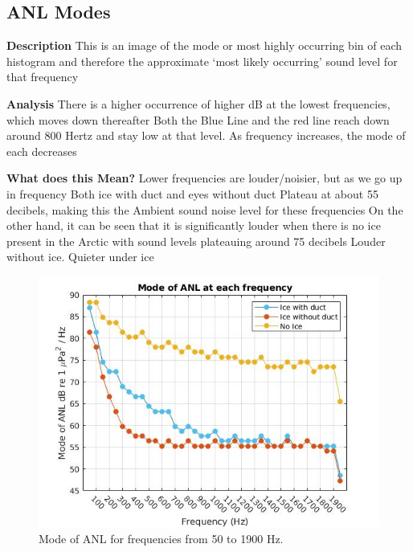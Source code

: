 \subsection{ANL Modes}
\textbf{Description}
This is an image of the mode or most highly occurring bin of each histogram and therefore the approximate ‘most likely occurring’ sound level for that frequency

\textbf{Analysis}
There is a higher occurrence of higher dB at the lowest frequencies, which moves down thereafter
 Both the Blue Line and the red line reach down around 800 Hertz and stay low at that level.
As frequency increases, the mode of each decreases

\textbf{What does this Mean?}
Lower frequencies are louder/noisier, but as we go up in frequency Both ice with duct and eyes without duct Plateau at about 55 decibels, making this the Ambient sound noise level for these frequencies
On the other hand, it can be seen that it is significantly louder when there is no ice present in the Arctic with sound levels plateauing around 75 decibels
Louder without ice. Quieter under ice

\begin{figure}[H]
\centering
\includegraphics[scale=0.5]{Figures/mode_ANL_allfreqs.jpg}
\caption{Mode of ANL for frequencies from 50 to 1900 Hz.}
\label{fig_mode}
\end{figure}





